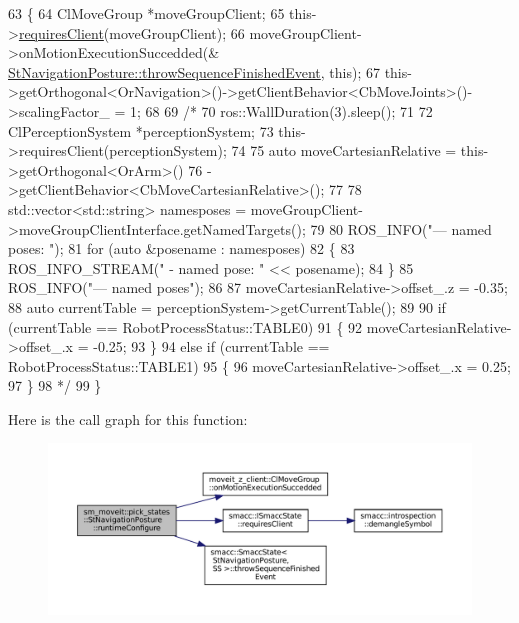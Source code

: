 \begin{DoxyCode}
63     \{
64         ClMoveGroup *moveGroupClient;
65         this->\hyperlink{classsmacc_1_1ISmaccState_a7f95c9f0a6ea2d6f18d1aec0519de4ac}{requiresClient}(moveGroupClient);
66         moveGroupClient->onMotionExecutionSuccedded(&
      \hyperlink{classsmacc_1_1SmaccState_a49dcfc25824f7e083dd4b999c49ab2b6}{StNavigationPosture::throwSequenceFinishedEvent}, \textcolor{keyword}{this});
67         this->getOrthogonal<OrNavigation>()->getClientBehavior<CbMoveJoints>()->scalingFactor\_ = 1;
68 
69         \textcolor{comment}{/*}
70 \textcolor{comment}{        ros::WallDuration(3).sleep();}
71 \textcolor{comment}{}
72 \textcolor{comment}{        ClPerceptionSystem *perceptionSystem;}
73 \textcolor{comment}{        this->requiresClient(perceptionSystem);}
74 \textcolor{comment}{}
75 \textcolor{comment}{        auto moveCartesianRelative = this->getOrthogonal<OrArm>()}
76 \textcolor{comment}{                                         ->getClientBehavior<CbMoveCartesianRelative>();}
77 \textcolor{comment}{}
78 \textcolor{comment}{        std::vector<std::string> namesposes = moveGroupClient->moveGroupClientInterface.getNamedTargets();}
79 \textcolor{comment}{}
80 \textcolor{comment}{        ROS\_INFO("--- named poses: ");}
81 \textcolor{comment}{        for (auto &posename : namesposes)}
82 \textcolor{comment}{        \{}
83 \textcolor{comment}{            ROS\_INFO\_STREAM(" - named pose: " << posename);}
84 \textcolor{comment}{        \}}
85 \textcolor{comment}{        ROS\_INFO("--- named poses");}
86 \textcolor{comment}{}
87 \textcolor{comment}{        moveCartesianRelative->offset\_.z = -0.35;}
88 \textcolor{comment}{        auto currentTable = perceptionSystem->getCurrentTable();}
89 \textcolor{comment}{}
90 \textcolor{comment}{        if (currentTable == RobotProcessStatus::TABLE0)}
91 \textcolor{comment}{        \{}
92 \textcolor{comment}{            moveCartesianRelative->offset\_.x = -0.25;}
93 \textcolor{comment}{        \}}
94 \textcolor{comment}{        else if (currentTable == RobotProcessStatus::TABLE1)}
95 \textcolor{comment}{        \{}
96 \textcolor{comment}{            moveCartesianRelative->offset\_.x = 0.25;}
97 \textcolor{comment}{        \}}
98 \textcolor{comment}{    */}
99     \}
\end{DoxyCode}
Here is the call graph for this function\+:
\nopagebreak
\begin{figure}[H]
\begin{center}
\leavevmode
\includegraphics[width=350pt]{structsm__moveit_1_1pick__states_1_1StNavigationPosture_add5f3d828cb52f6320e5d60fbbf7dec6_cgraph}
\end{center}
\end{figure}
